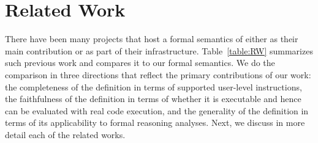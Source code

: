 \section{Related Work}\label{sec:RW}

% 
% 

There have been many projects that host a formal semantics of \ISA either as
their main contribution or as part of their infrastructure.
Table~\ref{table:RW} summarizes such previous work and compares it to our formal
semantics. We do the comparison in three directions that reflect the
primary contributions of our work: the completeness of the definition in terms
of supported user-level instructions, the faithfulness of the definition in
terms of whether it is executable and hence can be evaluated with real code
execution, and the generality of the definition in terms of its applicability to
formal reasoning analyses. Next, we discuss in more detail each of the
related works.


